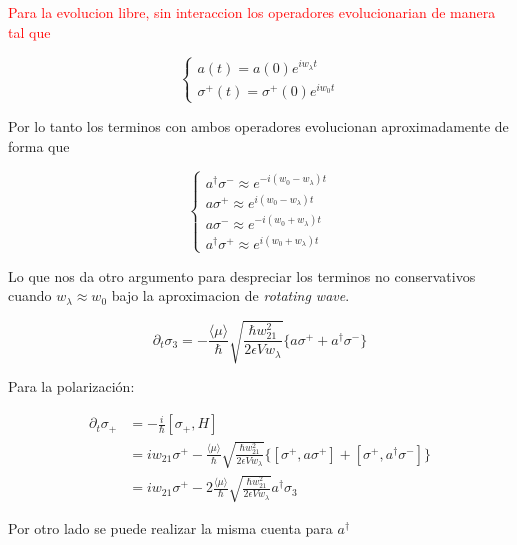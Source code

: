 \textcolor{red}{Para la evolucion libre, sin interaccion los operadores evolucionarian de manera tal que }

\begin{equation}
	\begin{cases}
		a(t)=a(0)e^{iw_{\lambda}t}\\
		\sigma^+(t)=\sigma^+(0)e^{iw_0t}
	\end{cases}
\end{equation}

Por lo tanto los terminos con ambos operadores evolucionan aproximadamente de forma que 

\begin{equation}
	\begin{cases}
		a^{\dagger}\sigma^- \approx  e^{-i(w_0-w_{\lambda})t}\\
		a\sigma^+ \approx e^{i(w_0-w_{\lambda})t}\\
		a\sigma^- \approx e^{-i(w_0+w_{\lambda})t}\\
		a^{\dagger}\sigma^+ \approx e^{i(w_0+w_{\lambda})t}
	\end{cases}
\end{equation}

Lo que nos da otro argumento para despreciar los terminos no conservativos cuando $w_{\lambda} \approx w_0$ bajo la aproximacion de \textit{rotating wave}.





\begin{equation}
	\partial_t \sigma_3=-\frac{\langle \mu \rangle }{\hbar}	\sqrt{ \frac{\hbar w_{21}^2}{2\epsilon V w_{\lambda} } } \{ a\sigma^+ + a^{\dagger}\sigma^-   \}
\end{equation}


Para la polarización:

\begin{align}
	\partial_t \sigma_+ & =-\frac{i}{\hbar}[\sigma_+,H]	 \nonumber \\
						& = iw_{21}\sigma^+ - \frac{\langle \mu \rangle }{\hbar} \sqrt{ \frac{\hbar w_{21}^2}{2\epsilon V w_{\lambda} } }    \{ [\sigma^+,a\sigma^+]+[\sigma^+,a^{\dagger}\sigma^-]   \} \nonumber \\
						& =  iw_{21}\sigma^+ - 2 \frac{\langle \mu \rangle }{\hbar} \sqrt{ \frac{\hbar w_{21}^2}{2\epsilon V w_{\lambda} } }   a^{\dagger}\sigma_3
\end{align}



Por otro lado se puede realizar la misma cuenta para $a^{\dagger}$

